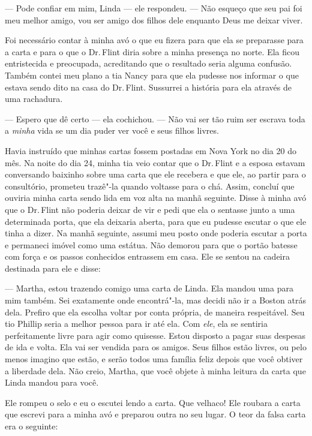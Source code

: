 --- Pode confiar em mim, Linda --- ele respondeu. --- Não esqueço que
seu pai foi meu melhor amigo, vou ser amigo dos filhos dele enquanto
Deus me deixar viver.

Foi necessário contar à minha avó o que
eu fizera para que ela se preparasse para a carta e para o que o Dr.\,Flint diria sobre a minha presença no norte. Ela ficou entristecida e
preocupada, acreditando que o resultado seria alguma confusão. Também
contei meu plano a tia Nancy para que ela pudesse nos informar o que
estava sendo dito na casa do Dr.\,Flint. Sussurrei a história para ela
através de uma rachadura.

--- Espero que dê certo --- ela cochichou. --- Não vai ser tão ruim ser
escrava toda a \emph{minha} vida se um dia puder ver você e seus filhos
livres.

Havia instruído que minhas cartas
fossem postadas em Nova York no dia 20 do mês. Na noite do dia 24, minha
tia veio contar que o Dr.\,Flint e a esposa estavam conversando baixinho
sobre uma carta que ele recebera e que ele, ao partir para o
consultório, prometeu trazê"-la quando voltasse para o chá. Assim,
concluí que ouviria minha carta sendo lida em voz alta na manhã
seguinte. Disse à minha avó que o Dr.\,Flint não poderia deixar de vir e
pedi que ela o sentasse junto a uma determinada porta, que ela deixaria
aberta, para que eu pudesse escutar o que ele tinha a dizer. Na manhã
seguinte, assumi meu posto onde poderia escutar a porta e permaneci
imóvel como uma estátua. Não demorou para que o portão batesse com força
e os passos conhecidos entrassem em casa. Ele se sentou na cadeira
destinada para ele e disse:

--- Martha, estou trazendo comigo uma carta de Linda. Ela mandou uma
para mim também. Sei exatamente onde encontrá"-la, mas decidi não ir a
Boston atrás dela. Prefiro que ela escolha voltar por conta própria, de
maneira respeitável. Seu tio Phillip seria a melhor pessoa para ir até
ela. Com \emph{ele}, ela se sentiria perfeitamente livre para agir como
quisesse. Estou disposto a pagar suas despesas de ida e volta. Ela vai
ser vendida para os amigos. Seus filhos estão livres, ou pelo menos
imagino que estão, e serão todos uma família feliz depois que você
obtiver a liberdade dela. Não creio, Martha, que você objete à minha
leitura da carta que Linda mandou para você.

Ele rompeu o selo e eu o escutei lendo
a carta. Que velhaco! Ele roubara a carta que escrevi para a minha avó e
preparou outra no seu lugar. O teor da falsa carta era o seguinte:


